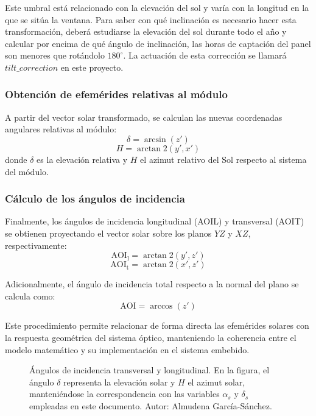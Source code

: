 Este umbral está relacionado con la elevación del sol y varía con la longitud en la que se sitúa la ventana. Para saber con qué inclinación es necesario hacer esta transformación, deberá estudiarse la elevación del sol durante todo el año y calcular por encima de qué ángulo de inclinación, las horas de captación del panel son menores que rotándolo $180^\circ$. La actuación de esta corrección se llamará $tilt\_correction$ en este proyecto. 

\subsubsection{Obtención de efemérides relativas al módulo}

A partir del vector solar transformado, se calculan las nuevas coordenadas angulares relativas al módulo:
\begin{equation}
	\delta = \arcsin(z')
\end{equation}
\begin{equation}
	H = \arctan2(y',x')
\end{equation}
donde $\delta$ es la elevación relativa y $H$ el azimut relativo del Sol respecto al sistema del módulo.

\subsubsection{Cálculo de los ángulos de incidencia}\label{sec:aoi}

Finalmente, los ángulos de incidencia longitudinal (AOIL) y transversal (AOIT) se obtienen proyectando el vector solar sobre los planos $YZ$ y $XZ$, respectivamente:
\begin{equation}
	\mathrm{AOI_l} = \arctan2(y', z')
\end{equation}
\begin{equation}
	\mathrm{AOI_t} = \arctan2(x', z')
\end{equation}

Adicionalmente, el ángulo de incidencia total respecto a la normal del plano se calcula como:
\begin{equation}
	\mathrm{AOI} = \arccos(z')
\end{equation}

Este procedimiento permite relacionar de forma directa las efemérides solares con la respuesta geométrica del sistema óptico, manteniendo la coherencia entre el modelo matemático y su implementación en el sistema embebido.

\begin{figure}
	\centering
	
	\caption{Ángulos de incidencia transversal y longitudinal. En la figura, el ángulo $\delta$ representa la elevación solar y $H$ el azimut solar, manteniéndose la correspondencia con las variables $\alpha_s$ y $\delta_s$ empleadas en este documento. Autor: Almudena García-Sánchez.}
	\label{fig:aoiangles}
\end{figure}

